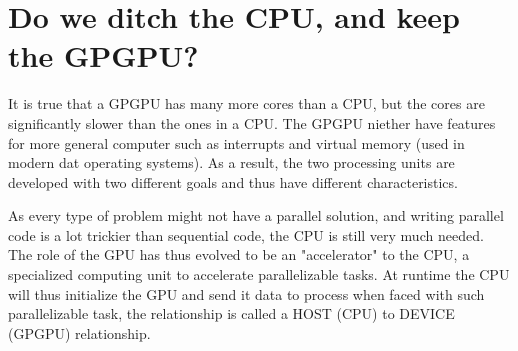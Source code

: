 \section{Do we ditch the CPU, and keep the GPGPU?}
\label{sec:cpu vs gpu}

It is true that a GPGPU has many more cores than a CPU, but the cores are significantly slower than the ones in a CPU.
The GPGPU niether have features for more general computer such as interrupts and virtual memory (used in modern dat operating systems).
As a result, the two processing units are developed with two different goals and thus have different characteristics.

As every type of problem might not have a parallel solution, and writing parallel code is a lot trickier than sequential code, the CPU is still very much needed.
The role of the GPU has thus evolved to be an "accelerator" to the CPU, a specialized computing unit to accelerate parallelizable tasks.
At runtime the CPU will thus initialize the GPU and send it data to process when faced with such parallelizable task, the relationship is called a HOST (CPU) to DEVICE (GPGPU) relationship.
